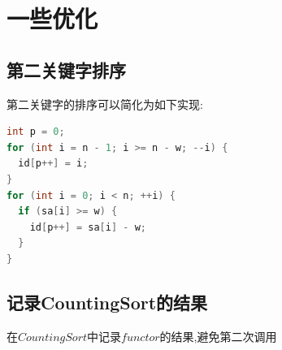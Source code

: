 \documentclass{article}
\begin{document}
\section{一些优化}
\subsection{第二关键字排序}
第二关键字的排序可以简化为如下实现: \par
\begin{lstlisting}[language=C++, caption={Second Key Sort}]
int p = 0;
for (int i = n - 1; i >= n - w; --i) {
  id[p++] = i;
}
for (int i = 0; i < n; ++i) {
  if (sa[i] >= w) {
    id[p++] = sa[i] - w;
  }
}
\end{lstlisting}
\subsection{记录CountingSort的结果}
在$CountingSort$中记录$functor$的结果,避免第二次调用
\end{document}
